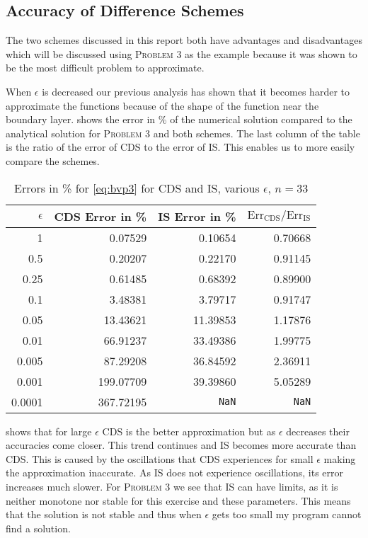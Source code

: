 \documentclass[../00_main.tex]{article}
\begin{document}
\subsection{Accuracy of Difference Schemes}

The two schemes discussed in this report both have advantages and
disadvantages which will be discussed using \textsc{Problem 3} as the example
because it was shown to be the most difficult problem to approximate. 

When $\epsilon$ is decreased our previous analysis has shown that it becomes
harder to approximate the functions because of the shape of the function near
the boundary layer.  shows the error in \% of the
numerical solution compared to the analytical solution for \textsc{Problem 3} 
and both schemes. The last column of the table is the ratio of the error of CDS 
to the error of IS. This enables us to more easily compare the schemes. 
\begin{table}[h]
\centering
\begin{tabular}{| r | r | r | r |}\hline
    $\epsilon$  & CDS Error in \%   & IS Error in \% & $\text{Err}_{\text{CDS}}
    /\text{Err}_{\text{IS}}$   \\\hline\hline
    1       &   0.07529  &   0.10654  &  0.70668    \\\hline
    0.5     &   0.20207  &   0.22170  &  0.91145    \\\hline
    0.25    &   0.61485  &   0.68392  &  0.89900    \\\hline
    0.1     &   3.48381  &   3.79717  &  0.91747    \\\hline
    0.05    &  13.43621  &  11.39853  &  1.17876    \\\hline
    0.01    &  66.91237  &  33.49386  &  1.99775    \\\hline
    0.005   &  87.29208  &  36.84592  &  2.36911    \\\hline
    0.001   & 199.07709  &  39.39860  &  5.05289    \\\hline
    0.0001  & 367.72195  &  \texttt{NaN} &   \texttt{NaN} \\\hline
\end{tabular}
    \vspace{15pt}
    \caption{Errors in \% for \eqref{eq:bvp3} for CDS and IS, various
    $\epsilon$, $n=33$}
    \label{tab:err_eps}
\end{table}
 shows that for large $\epsilon$ CDS is the better
approximation but as $\epsilon$ decreases their accuracies come closer. This
trend continues and IS becomes more accurate than CDS. This is caused by the
oscillations that CDS experiences for small $\epsilon$ making the
approximation inaccurate. As IS does not experience oscillations, its error
increases much slower. For \textsc{Problem 3} we see that IS can
have limits, as it is neither monotone nor stable for this exercise and these 
parameters. This
means that the solution is not stable and thus when $\epsilon$ gets too small
my program cannot find a solution. 
\end{document}
